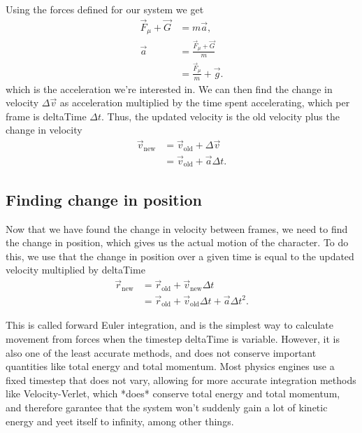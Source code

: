 \documentclass[%
notitlepage,
 amsmath,amssymb,
 aps,
]{revtex4-2}  %
\begin{document}
Using the forces defined for our system we get
 \begin{align*}
    \vec{F}_{\mu} + \vec{G} &= m\vec{a}, \\
    \vec{a} &= \frac{\vec{F}_{\mu} + \vec{G}}{m} \\
            &= \frac{\vec{F}_{\mu}}{m} + \vec{g}.
\end{align*}
which is the acceleration we're interested in. We can then find the change in velocity \(\Delta\vec{v}\) as acceleration multiplied by the time spent accelerating, which per frame is deltaTime \(\Delta t\). Thus, the updated velocity is the old velocity plus the change in velocity
\begin{align*}
    \vec{v}_{\text{new}} &= \vec{v}_{\text{old}} + \Delta\vec{v} \\
                         &= \vec{v}_{\text{old}} + \vec{a}\Delta t.
\end{align*}

\subsection{Finding change in position}
Now that we have found the change in velocity between frames, we need to find the change in position, which gives us the actual motion of the character. To do this, we use that the change in position over a given time is equal to the updated velocity multiplied by deltaTime
\begin{align*}
    \vec{r}_{\text{new}} &= \vec{r}_{\text{old}} + \vec{v}_{\text{new}}\Delta t \\
                         &= \vec{r}_{\text{old}} + \vec{v}_{\text{old}}\Delta t + \vec{a}\Delta t^{2}.
\end{align*}

This is called forward Euler integration, and is the simplest way to calculate movement from forces when the timestep deltaTime is variable. However, it is also one of the least accurate methods, and does not conserve important quantities like total energy and total momentum. Most physics engines use a fixed timestep that does not vary, allowing for more accurate integration methods like Velocity-Verlet, which *does* conserve total energy and total momentum, and therefore garantee that the system won't suddenly gain a lot of kinetic energy and yeet itself to infinity, among other things.
\end{document}
